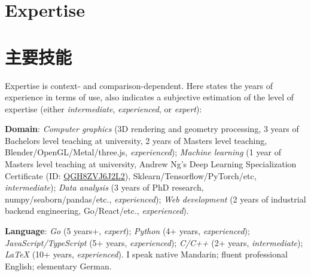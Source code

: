  {
  \section{\textbf{Expertise}}
}{
  \section{\textbf{主要技能}}
}
 {
\small
Expertise is context- and comparison-dependent. Here states the years of experience in terms of use, also indicates a subjective estimation of the level of expertise (either \emph{intermediate}, \emph{experienced}, or \emph{expert}):
\resumeSubHeadingListStart
\small
\item{\textbf{Domain}:
\emph{Computer graphics} (3D rendering and geometry processing, 3 years of Bachelors level teaching at university, 2 years of Masters level teaching, Blender/OpenGL/Metal/three.js, \emph{experienced});
\emph{Machine learning} (1 year of Masters level teaching at university, Andrew Ng's Deep Learning Specialization Certificate (ID: \href{https://www.coursera.org/account/accomplishments/specialization/QGH8ZVJ6J2L2}{QGH8ZVJ6J2L2}), Sklearn/Tensorflow/PyTorch/etc, \emph{intermediate});
\emph{Data analysis} (3 years of PhD research, numpy/seaborn/pandas/etc., \emph{experienced});
\emph{Web development} (2 years of industrial backend engineering, Go/React/etc., \emph{experienced}).
}
\item{\textbf{Language}:
\emph{Go} (5 years+, \emph{expert});
\emph{Python} (4+ years, \emph{experienced});
\emph{JavaScript/TypeScript} (5+ years, \emph{experienced});
\emph{C/C++} (2+ years, \emph{intermediate});
\emph{\LaTeX} (10+ years, \emph{experienced}).
I speak native Mandarin; fluent professional English; elementary German.
}
\resumeSubHeadingListEnd
}{
\resumeSubHeadingListStart
\small
\item{
}}

